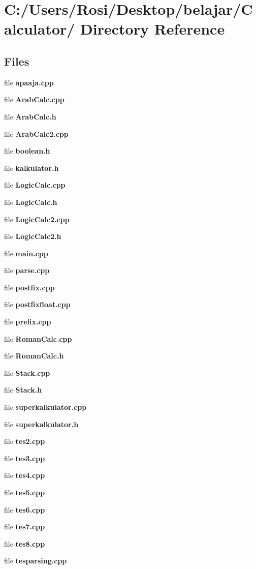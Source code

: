 \section{C:/Users/Rosi/Desktop/belajar/Calculator/ Directory Reference}
\label{dir_C_3A_2FUsers_2FRosi_2FDesktop_2Fbelajar_2FCalculator_2F}


\subsection*{Files}
\begin{CompactItemize}
\item 
file {\bf apaaja.cpp}
\item 
file {\bf Arab\-Calc.cpp}
\item 
file {\bf Arab\-Calc.h}
\item 
file {\bf Arab\-Calc2.cpp}
\item 
file {\bf boolean.h}
\item 
file {\bf kalkulator.h}
\item 
file {\bf Logic\-Calc.cpp}
\item 
file {\bf Logic\-Calc.h}
\item 
file {\bf Logic\-Calc2.cpp}
\item 
file {\bf Logic\-Calc2.h}
\item 
file {\bf main.cpp}
\item 
file {\bf parse.cpp}
\item 
file {\bf postfix.cpp}
\item 
file {\bf postfixfloat.cpp}
\item 
file {\bf prefix.cpp}
\item 
file {\bf Roman\-Calc.cpp}
\item 
file {\bf Roman\-Calc.h}
\item 
file {\bf Stack.cpp}
\item 
file {\bf Stack.h}
\item 
file {\bf superkalkulator.cpp}
\item 
file {\bf superkalkulator.h}
\item 
file {\bf tes2.cpp}
\item 
file {\bf tes3.cpp}
\item 
file {\bf tes4.cpp}
\item 
file {\bf tes5.cpp}
\item 
file {\bf tes6.cpp}
\item 
file {\bf tes7.cpp}
\item 
file {\bf tes8.cpp}
\item 
file {\bf tesparsing.cpp}
\end{CompactItemize}
